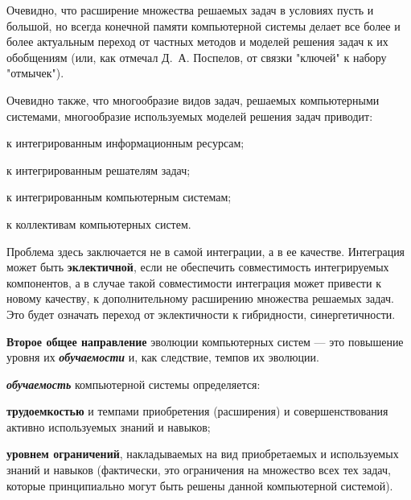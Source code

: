 Очевидно, что расширение множества решаемых задач в условиях пусть и большой, но всегда конечной памяти компьютерной системы делает все более и более актуальным переход от частных методов и моделей решения задач к их обобщениям (или, как отмечал Д.~А. Поспелов, от связки "ключей"{} к набору "отмычек").

Очевидно также, что многообразие видов задач, решаемых компьютерными системами, многообразие используемых моделей решения задач приводит: 
\begin{textitemize}
	\item к интегрированным информационным ресурсам;
	\item к интегрированным решателям задач;
	\item к интегрированным компьютерным системам;
	\item к коллективам компьютерных систем.
\end{textitemize}

Проблема здесь заключается не в самой интеграции, а в ее качестве. Интеграция может быть \textbf{эклектичной}, если не обеспечить совместимость интегрируемых компонентов, а в случае такой совместимости интеграция может привести к новому качеству, к дополнительному расширению множества решаемых задач. Это будет означать переход от эклектичности к гибридности, синергетичности.

\textbf{Второе общее направление} эволюции компьютерных систем --- это повышение уровня их \textbf{\textit{обучаемости}} и, как следствие, темпов их эволюции.

\textbf{\textit{обучаемость}} компьютерной системы определяется:
\begin{textitemize}
	\item \textbf{трудоемкостью} и темпами приобретения (расширения) и совершенствования активно используемых знаний и навыков;
	\item \textbf{уровнем ограничений}, накладываемых на вид приобретаемых и используемых знаний и навыков (фактически, это ограничения на множество всех тех задач, которые принципиально могут быть решены данной компьютерной системой).
\end{textitemize}

